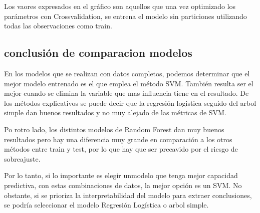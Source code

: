 \documentclass[]{article}
\begin{document}
Los vaores expresados en el gráfico son aquellos que una vez optimizado
los parámetros con Crossvalidation, se entrena el modelo sin particiones
utilizando todas las observaciones como train.

\hypertarget{conclusiuxf3n-de-comparacion-modelos}{%
\subsection{conclusión de comparacion
modelos}\label{conclusiuxf3n-de-comparacion-modelos}}

En los modelos que se realizan con datos completos, podemos determinar
que el mejor modelo entrenado es el que emplea el método SVM. También
resulta ser el mejor cuando se elimina la variable que mas influencia
tiene en el resultado. De los métodos explicativos se puede decir que la
regresión logistica seguido del arbol simple dan buenos resultados y no
muy alejado de las métricas de SVM.

Po rotro lado, los distintos modelos de Random Forest dan muy buenos
resultados pero hay una diferencia muy grande en comparación a los otros
métodos entre train y test, por lo que hay que ser precavido por el
riesgo de sobreajuste.

Por lo tanto, si lo importante es elegir unmodelo que tenga mejor
capacidad predictiva, con estas combinaciones de datos, la mejor opción
es un SVM. No obstante, si se prioriza la interpretabilidad del modelo
para extraer conclusiones, se podría seleccionar el modelo Regresión
Logística o arbol simple.
\end{document}
